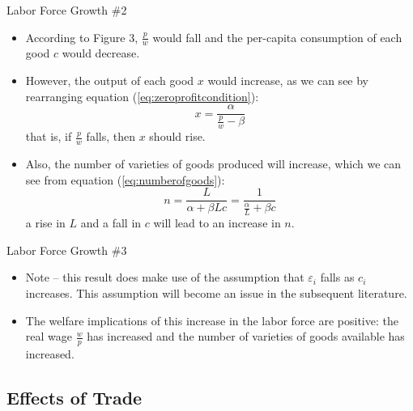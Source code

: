 \documentclass[aspectratio=169]{beamer}
\begin{document}
\begin{frame}{Labor Force Growth \#2}

\begin{itemize}
    \item<1-> According to Figure 3,  $ \frac{p}{w} $ would fall and the per-capita consumption of each good $ c $ would decrease.
    \item<2-> However, the output of each good $ x $ would increase, as we can see by rearranging equation (\ref{eq:zeroprofitcondition}):
    \begin{equation*}
        x = \frac{\alpha}{\frac{p}{w} - \beta}
    \end{equation*}
    that is, if $ \frac{p}{w} $ falls, then $ x $ should rise.
    \item<3-> Also, the number of varieties of goods produced will increase, which we can see from equation (\ref{eq:numberofgoods}):
    \begin{equation*}
        n = \frac{L}{\alpha + \beta Lc} = \frac{1}{\frac{\alpha}{L} + \beta c}
    \end{equation*}
    a rise in $ L $ and a fall in $ c $ will lead to an increase in $ n $.
\end{itemize}
    
\end{frame}


\begin{frame}{Labor Force Growth \#3}

\begin{itemize}
    \item<1-> Note – this result does make use of the assumption that $ \varepsilon_{i} $ falls as $ c_{i} $ increases.  This assumption will become an issue in the subsequent literature.
    \item<2-> The welfare implications of this increase in the labor force are positive:  the real wage $ \frac{w}{p} $ has increased and the number of varieties of goods available has increased.
\end{itemize}
    
\end{frame}


\subsection{Effects of Trade}
\end{document}
